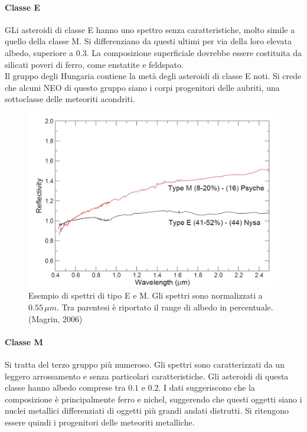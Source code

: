 \documentclass[a4paper,11pt,openright]{book}
\begin{document}
\paragraph*{Classe E}
GLi asteroidi di classe E hanno uno spettro senza caratteristiche, molto simile a quello della classe M. Si differenziano da questi ultimi per via della loro elevata albedo, superiore a $0.3$. La composizione superficiale dovrebbe essere costituita da silicati poveri di ferro, come enstatite e feldspato.\\
Il gruppo degli Hungaria contiene la metà degli asteroidi di classe E noti. Si crede che alcuni NEO di questo gruppo siano i corpi progenitori delle aubriti, una sottoclasse delle meteoriti acondriti.

\begin{figure}[h]
    \centering
    \includegraphics[scale=0.3]{figure/spettro_em.jpg}
    \caption[Esempio di spettri di tipo E e M.]{Esempio di spettri di tipo E e M. Gli spettri sono normalizzati a $0.55\,\mu m$. Tra parentesi è riportato il range di albedo in percentuale. (Magrin, 2006)}
    \label{spettro_em}
\end{figure}

\paragraph*{Classe M}
Si tratta del terzo gruppo più numeroso. Gli spettri sono caratterizzati da un leggero arrossamento e senza particolari caratteristiche. Gli asteroidi di questa classe hanno albedo comprese tra $0.1$ e $0.2$. I dati suggeriscono che la composizione è principalmente ferro e nichel, suggerendo che questi oggetti siano i nuclei metallici differenziati di oggetti più grandi andati distrutti. Si ritengono essere quindi i progenitori delle meteoriti metalliche.
\end{document}
